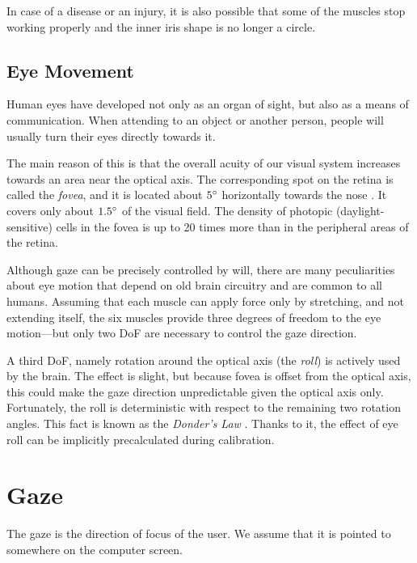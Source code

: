 In case of a disease or an injury, it is also possible that some of the muscles stop working properly and the inner iris shape is no longer a circle.

\subsection{Eye Movement}

Human eyes have developed not only as an organ of sight, but also as a means of communication.
When attending to an object or another person, people will usually turn their eyes directly towards it.

The main reason of this is that the overall acuity of our visual system increases towards an area near the optical axis.
The corresponding spot on the retina is called the \textit{fovea}, and it is located about $5\degree$ horizontally towards the nose \cite{villanueva08}.
It covers only about $1.5\degree$ of the visual field.
The density of photopic (daylight-sensitive) cells in the fovea is up to 20 times more than in the peripheral areas of the retina.

Although gaze can be precisely controlled by will, there are many peculiarities about eye motion that depend on old brain circuitry and are common to all humans.
Assuming that each muscle can apply force only by stretching, and not extending itself, the six muscles provide three degrees of freedom to the eye motion---but only two DoF are necessary to control the gaze direction.

A third DoF, namely rotation around the optical axis (the \textit{roll}) is actively used by the brain.
The effect is slight, but because fovea is offset from the optical axis, this could make the gaze direction unpredictable given the optical axis only.
Fortunately, the roll is deterministic with respect to the remaining two rotation angles.
This fact is known as the \textit{Donder's Law} \cite{hansen10}.
Thanks to it, the effect of eye roll can be implicitly precalculated during calibration.


\section{Gaze}
\label{s:gaze-model}

The gaze is the direction of focus of the user.
We assume that it is pointed to somewhere on the computer screen.


